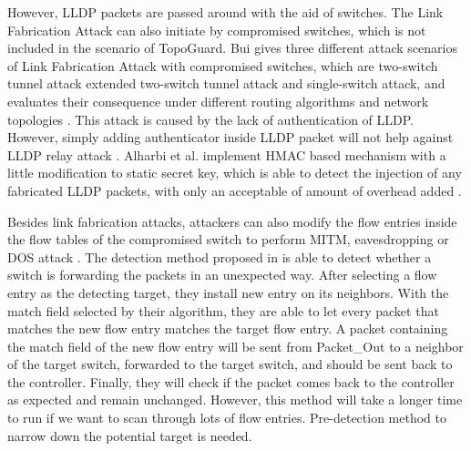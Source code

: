 However, LLDP packets are passed around with the aid of switches. The Link Fabrication Attack can also initiate by compromised switches, which is not included in the scenario of TopoGuard. Bui gives three different attack scenarios of Link Fabrication Attack with compromised switches, which are two-switch tunnel attack extended two-switch tunnel attack and single-switch attack, and evaluates their consequence under different routing algorithms and network topologies \cite{TTB15}. This attack is caused by the lack of authentication of LLDP. However, simply adding authenticator inside LLDP packet will not help against LLDP relay attack \cite{HXWG15}. Alharbi et al. implement HMAC based mechanism with a little modification to static secret key, which is able to detect the injection of any fabricated LLDP packets, with only an acceptable of amount of overhead added \cite{ATPP15}.

Besides link fabrication attacks, attackers can also modify the flow entries inside the flow tables of the compromised switch to perform MITM, eavesdropping or DOS attack \cite{AAS14}. The detection method proposed in \cite{CKGL15} is able to detect whether a switch is forwarding the packets in an unexpected way. After selecting a flow entry as the detecting target, they install new entry on its neighbors. With the match field selected by their algorithm, they are able to let every packet that matches the new flow entry matches the target flow entry. A packet containing the match field of the new flow entry will be sent from Packet\_Out to a neighbor of the target switch, forwarded to the target switch, and should be sent back to the controller. Finally, they will check if the packet comes back to the controller as expected and remain unchanged. However, this method will take a longer time to run if we want to scan through lots of flow entries. Pre-detection method to narrow down the potential target is needed.
